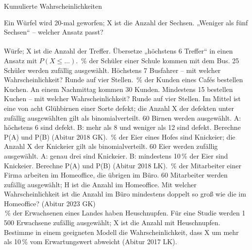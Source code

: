 \setcounter{aufgabe}{14}

\begin{aufgabe}{Kumulierte Wahrscheinlichkeiten}
\begin{teile}
\teil Ein Würfel wird 20-mal geworfen; X ist die Anzahl der Sechsen. „Weniger als fünf Sechsen“ – welcher Ansatz passt?  \\  \\ 
 Würfe; X ist die Anzahl der Treffer. Übersetze „höchstens 6 Treffer“ in einen Ansatz mit $P(X \le \ldots)$.
\,\% der Schüler einer Schule kommen mit dem Bus. 25 Schüler werden zufällig ausgewählt. Höchstens 7 Busfahrer – mit welcher Wahrscheinlichkeit? Runde auf vier Stellen. \leerfeld
{}\,\% der Kunden eines Cafés bestellen Kuchen. An einem Nachmittag kommen 30 Kunden. Mindestens 15 bestellen Kuchen – mit welcher Wahrscheinlichkeit? Runde auf vier Stellen. \leerfeld
\teil Im Mittel ist eine von acht Glühbirnen einer Sorte defekt; die Anzahl X der defekten unter zufällig ausgewählten gilt als binomialverteilt. 60 Birnen werden ausgewählt. A: höchstens 6 sind defekt. B: mehr als 8 und weniger als 12 sind defekt. Berechne P(A) und P(B) \hfill (Abitur 2018 GK).
\,\% der Eier eines Hofes sind Knickeier; die Anzahl X der Knickeier gilt als binomialverteilt. 60 Eier werden zufällig ausgewählt. A: genau drei sind Knickeier. B: mindestens 10\,\% der Eier sind Knickeier. Berechne P(A) und P(B) \hfill (Abitur 2018 LK).
\,\% der Mitarbeiter einer Firma arbeiten im Homeoffice, die übrigen im Büro. 60 Mitarbeiter werden zufällig ausgewählt; H ist die Anzahl im Homeoffice. Mit welcher Wahrscheinlichkeit ist die Anzahl im Büro mindestens doppelt so groß wie die im Homeoffice? \hfill (Abitur 2023 GK) \\ \leerfeld
{}\,\% der Erwachsenen eines Landes haben Heuschnupfen. Für eine Studie werden 1\,500 Erwachsene zufällig ausgewählt; X ist die Anzahl mit Heuschnupfen. Bestimme in einem geeigneten Modell die Wahrscheinlichkeit, dass X um mehr als 10\,\% vom Erwartungswert abweicht \hfill (Abitur 2017 LK). \leerfeld

\end{teile}
\end{aufgabe}
